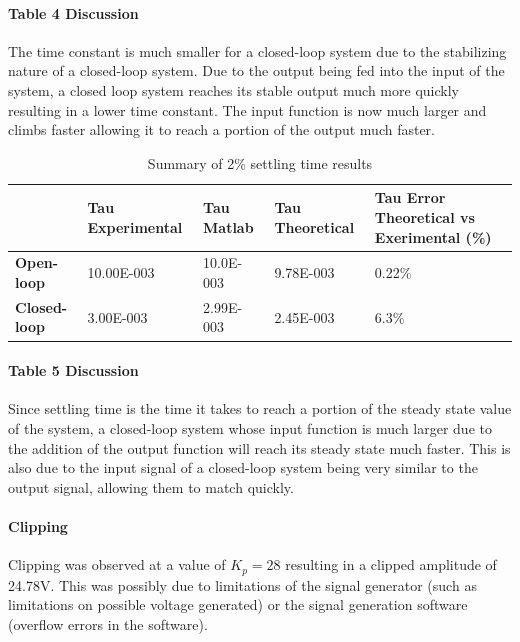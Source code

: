 \documentclass[12pt]{article}
\begin{document}
\paragraph{Table 4 Discussion} %
\label{par:table_4_discussion}
The time constant is much smaller for a closed-loop system due to the stabilizing nature of a closed-loop system. Due to the output being fed into the input of the system, a closed loop system reaches its stable output much more quickly resulting in a lower time constant. The input function is now much larger and climbs faster allowing it to reach a portion of the output much faster.

\begin{table}[ht]
\centering
    \begin{tabular}{|l|p{3cm}|p{3cm}|p{3cm}|p{3cm}|}
        \hline
        & \textbf{Tau Experimental} & \textbf{Tau Matlab} & \textbf{Tau Theoretical} & \textbf{Tau Error Theoretical vs Exerimental (\%)}\\
        \hline
        \textbf{Open-loop} & 10.00E-003 & 10.0E-003 & 9.78E-003 & 0.22\%\\
        \hline
        \textbf{Closed-loop} & 3.00E-003 & 2.99E-003 & 2.45E-003 & 6.3\%\\
        \hline
    \end{tabular}
    \caption{Summary of 2\% settling time results}
    \label{tab:settle-summary}
\end{table}

\paragraph{Table 5 Discussion} %
\label{par:table_5_discussion}
Since settling time is the time it takes to reach a portion of the steady state value of the system, a closed-loop system whose input function is much larger due to the addition of the output function will reach its steady state much faster. This is also due to the input signal of a closed-loop system being very similar to the output signal, allowing them to match quickly.

\paragraph{Clipping} %
\label{par:clipping}
Clipping was observed at a value of $K_p = 28$ resulting in a clipped amplitude of 24.78V. This was possibly due to limitations of the signal generator (such as limitations on possible voltage generated) or the signal generation software (overflow errors in the software).
\end{document}
